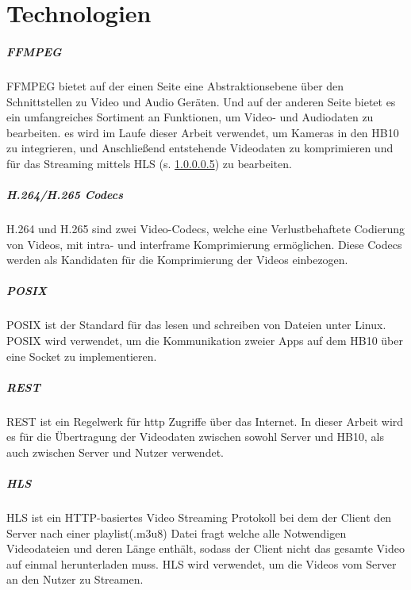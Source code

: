
\chapter{Technologien}

\paragraph{FFMPEG}  \label{par:ffmpeg}
FFMPEG bietet auf der einen Seite eine Abstraktionsebene über den Schnittstellen zu Video und Audio Geräten. Und auf der anderen Seite bietet es ein umfangreiches Sortiment an Funktionen, um Video- und Audiodaten zu bearbeiten.
es wird im Laufe dieser Arbeit verwendet, um Kameras in den HB10 zu integrieren, und Anschließend entstehende Videodaten zu komprimieren und für das Streaming mittels HLS (s. \ref{par:hls}) zu bearbeiten.

\paragraph{H.264/H.265 Codecs} \label{par:codecs}
H.264 und H.265 sind zwei Video-Codecs, welche eine Verlustbehaftete Codierung von Videos, mit intra- und interframe Komprimierung ermöglichen.
Diese Codecs werden als Kandidaten für die Komprimierung der Videos einbezogen.

\paragraph{POSIX} \label{par:posix}
POSIX ist der Standard für das lesen und schreiben von Dateien unter Linux. POSIX wird verwendet, um die Kommunikation zweier Apps auf dem HB10 über eine Socket zu implementieren.


\paragraph{REST} \label{par:rest}
REST ist ein Regelwerk für http Zugriffe über das Internet. In dieser Arbeit wird es für die Übertragung der Videodaten zwischen sowohl Server und HB10, als auch zwischen Server und Nutzer verwendet.

\paragraph{HLS} \label{par:hls}
HLS ist ein HTTP-basiertes Video Streaming Protokoll bei dem der Client den Server nach einer playlist(.m3u8) Datei fragt welche alle Notwendigen Videodateien und deren Länge enthält, sodass der Client nicht das gesamte Video auf einmal herunterladen muss.
HLS wird verwendet, um die Videos vom Server an den Nutzer zu Streamen.

